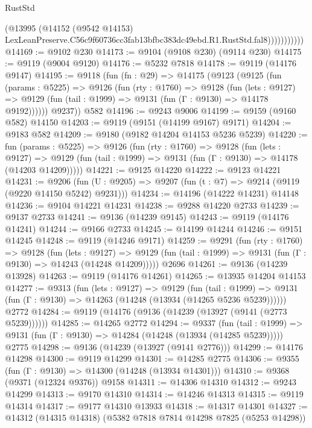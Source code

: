 \begin{lexlean}{RustStd}
\begin{coremodule}
                      (@13995
                        (@14152
                          (@9542 @14153)
                          LexLeanPreserve.C56c9f60736cc3fab13bfbc383dc49ebd.R1.RustStd.fal8)))))))))))
@14169 := @9102 @230
@14173 := @9104 (@9108 @230) (@9114 @230)
@14175 := @9119 (@9004 @9120)
@14176 := @5232 @7818
@14178 := @9119 (@14176 @9147)
@14195 := @9118
    (fun (fn : @29) =>
    @14175
      (@9123
        (@9125
          (fun (params : @5225) =>
          @9126
            (fun (rty : @1760) =>
            @9128
              (fun (lets : @9127) =>
              @9129 (fun (tail : @1999) => @9131 (fun (Γ : @9130) => @14178 @9192))))))
        @9237))
    @582
@14196 := @9243 @9006
@14199 := @9159 (@9160 @582) @14150
@14203 := @9119 (@9151 (@14199 @9167) @9171)
@14204 := @9183 @582
@14209 := @9180 (@9182 @14204 @14153 @5236 @5239)
@14220 := fun (params : @5225) =>
  @9126
    (fun (rty : @1760) =>
    @9128
      (fun (lets : @9127) =>
      @9129 (fun (tail : @1999) => @9131 (fun (Γ : @9130) => @14178 (@14203 @14209)))))
@14221 := @9125 @14220
@14222 := @9123 @14221
@14231 := @9206
    (fun (U : @9205) => @9207 (fun (t : @7) => @9214 (@9119 (@9220 @14150 @5242) @9231)))
@14234 := @14196 (@14222 @14231) @14148
@14236 := @9104 @14221 @14231
@14238 := @9288 @14220 @2733
@14239 := @9137 @2733
@14241 := @9136 (@14239 @9145)
@14243 := @9119 (@14176 @14241)
@14244 := @9166 @2733
@14245 := @14199 @14244
@14246 := @9151 @14245
@14248 := @9119 (@14246 @9171)
@14259 := @9291
    (fun (rty : @1760) =>
    @9128
      (fun (lets : @9127) =>
      @9129 (fun (tail : @1999) => @9131 (fun (Γ : @9130) => @14243 (@14248 @14209)))))
    @2696
@14261 := @9136 (@14239 @13928)
@14263 := @9119 (@14176 @14261)
@14265 := @13935 @14204 @14153
@14277 := @9313
    (fun (lets : @9127) =>
    @9129
      (fun (tail : @1999) =>
      @9131 (fun (Γ : @9130) => @14263 (@14248 (@13934 (@14265 @5236 @5239))))))
    @2772
@14284 := @9119 (@14176 (@9136 (@14239 (@13927 (@9141 (@2773 @5239))))))
@14285 := @14265 @2772
@14294 := @9337
    (fun (tail : @1999) => @9131 (fun (Γ : @9130) => @14284 (@14248 (@13934 (@14285 @5239)))))
    @2775
@14298 := @9136 (@14239 (@13927 (@9141 @2776)))
@14299 := @14176 @14298
@14300 := @9119 @14299
@14301 := @14285 @2775
@14306 := @9355 (fun (Γ : @9130) => @14300 (@14248 (@13934 @14301)))
@14310 := @9368 (@9371 (@12324 @9376)) @9158
@14311 := @14306 @14310
@14312 := @9243 @14299
@14313 := @9170 @14310
@14314 := @14246 @14313
@14315 := @9119 @14314
@14317 := @9177 @14310 @13933
@14318 := @14317 @14301
@14327 := @14312 (@14315 @14318) (@5382 @7818 @7814 @14298 @7825 (@5253 @14298))

\end{coremodule}
\end{lexlean}
